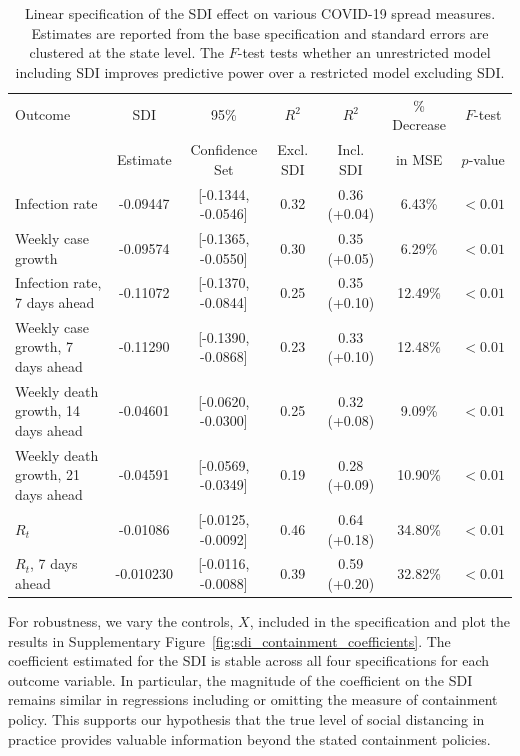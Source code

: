 \documentclass[dvipsnames]{article}
\begin{document}
\begin{table}[h!]
\begin{tabular}{lcccccc}
\toprule
                          Outcome &  SDI &                                             95\% &  $R^2$ &  $R^2$ &  \% Decrease &       $F$-test \\
                           &  Estimate  &             Confidence Set                      &  Excl. SDI &  Incl. SDI & in MSE  &      $p$-value  \\
\midrule
                      Infection rate & -0.09447 &  [-0.1344, -0.0546] &        0.32 &        0.36 (+0.04) &          6.43\% &  $<0.01$ \\
         Weekly case growth & -0.09574 &    [-0.1365, -0.0550] &        0.30 &        0.35 (+0.05) &          6.29\% &  $<0.01$ \\
                Infection rate, 7 days ahead & -0.11072 &   [-0.1370, -0.0844] &        0.25 &        0.35 (+0.10) &          12.49\% &   $<0.01$ \\
   Weekly case growth, 7 days ahead & -0.11290 &   [-0.1390, -0.0868] &        0.23 &        0.33 (+0.10) &          12.48\% &  $<0.01$ \\
 Weekly death growth, 14 days ahead & -0.04601 &  [-0.0620, -0.0300] &        0.25 &        0.32 (+0.08) &          9.09\% &  $<0.01$ \\
 Weekly death growth, 21 days ahead & -0.04591 &  [-0.0569, -0.0349] &        0.19 &        0.28 (+0.09) &          10.90\% &  $<0.01$ \\
                               $R_t$ & -0.01086 &   [-0.0125, -0.0092] &        0.46 &        0.64 (+0.18) &          34.80\% &   $<0.01$ \\
                            $R_t$, 7 days ahead & -0.010230 &   [-0.0116, -0.0088] &        0.39 &        0.59 (+0.20) &          32.82\% &   $<0.01$ \\
\bottomrule
\bottomrule
\end{tabular}
\caption{Linear specification of the SDI effect on various COVID-19 spread measures. Estimates are reported from the base specification and standard errors are clustered at the state level. The $F$-test tests whether an unrestricted model including SDI improves predictive power over a restricted model excluding SDI.}
\label{tab:reg_results}
\end{table}

For robustness, we vary the controls, $X$, included in the specification and plot the results in Supplementary Figure~\ref{fig:sdi_containment_coefficients}. The coefficient estimated for the SDI is stable across all four specifications for each outcome variable. In particular, the magnitude of the coefficient on the SDI remains similar in regressions including or omitting the measure of containment policy. This supports our hypothesis that the true level of social distancing in practice provides valuable information beyond the stated containment policies.
\end{document}
